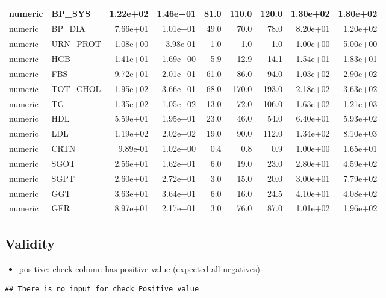 \documentclass{article}
\providecommand{\tightlist}{%
  \setlength{\itemsep}{0pt}\setlength{\parskip}{0pt}}
\begin{document}
\begin{longtable}{l|l|r|r|r|r|r|r|r}
\hline
numeric & BP\_SYS & 1.22e+02 & 1.46e+01 & 81.0 & 110.0 & 120.0 & 1.30e+02 & 1.80e+02\\
\hline
numeric & BP\_DIA & 7.66e+01 & 1.01e+01 & 49.0 & 70.0 & 78.0 & 8.20e+01 & 1.20e+02\\
\hline
numeric & URN\_PROT & 1.08e+00 & 3.98e-01 & 1.0 & 1.0 & 1.0 & 1.00e+00 & 5.00e+00\\
\hline
numeric & HGB & 1.41e+01 & 1.69e+00 & 5.9 & 12.9 & 14.1 & 1.54e+01 & 1.83e+01\\
\hline
numeric & FBS & 9.72e+01 & 2.01e+01 & 61.0 & 86.0 & 94.0 & 1.03e+02 & 2.90e+02\\
\hline
numeric & TOT\_CHOL & 1.95e+02 & 3.66e+01 & 68.0 & 170.0 & 193.0 & 2.18e+02 & 3.63e+02\\
\hline
numeric & TG & 1.35e+02 & 1.05e+02 & 13.0 & 72.0 & 106.0 & 1.63e+02 & 1.21e+03\\
\hline
numeric & HDL & 5.59e+01 & 1.95e+01 & 23.0 & 46.0 & 54.0 & 6.40e+01 & 5.93e+02\\
\hline
numeric & LDL & 1.19e+02 & 2.02e+02 & 19.0 & 90.0 & 112.0 & 1.34e+02 & 8.10e+03\\
\hline
numeric & CRTN & 9.89e-01 & 1.02e+00 & 0.4 & 0.8 & 0.9 & 1.00e+00 & 1.65e+01\\
\hline
numeric & SGOT & 2.56e+01 & 1.62e+01 & 6.0 & 19.0 & 23.0 & 2.80e+01 & 4.59e+02\\
\hline
numeric & SGPT & 2.60e+01 & 2.72e+01 & 3.0 & 15.0 & 20.0 & 3.00e+01 & 7.79e+02\\
\hline
numeric & GGT & 3.63e+01 & 3.64e+01 & 6.0 & 16.0 & 24.5 & 4.10e+01 & 4.08e+02\\
\hline
numeric & GFR & 8.97e+01 & 2.17e+01 & 3.0 & 76.0 & 87.0 & 1.01e+02 & 1.96e+02\\
\hline
\end{longtable}

\newpage

\hypertarget{validity}{%
\subsection{Validity}\label{validity}}

\begin{itemize}
\tightlist
\item
  positive: check column has positive value (expected all negatives)
\end{itemize}

\begin{verbatim}
## There is no input for check Positive value
\end{verbatim}
\end{document}
